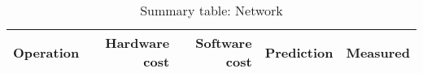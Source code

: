 \begin{table}[h]
\begin{center}
\begin{tabular}{| l | r | r | r | r |} \hline
Operation 			& Hardware cost 	& Software cost 	& Prediction	& Measured \\ \hline


\end{tabular}
\end{center}

\caption{Summary table: Network}

\end{table}












